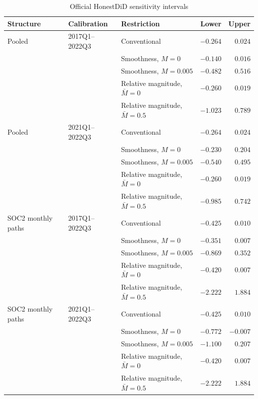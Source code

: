 \begin{table}[!htbp]
\centering
\caption{Official HonestDiD sensitivity intervals}\label{tab:app_honestdid}
\small
\begin{tabular}{lllrr}
\toprule
Structure & Calibration & Restriction & Lower & Upper \\
\midrule
Pooled & 2017Q1--2022Q3 & Conventional & $-0.264$ & $0.024$ \\
       &                 & Smoothness, $M=0$ & $-0.140$ & $0.016$ \\
       &                 & Smoothness, $M=0.005$ & $-0.482$ & $0.516$ \\
       &                 & Relative magnitude, $\bar M=0$ & $-0.260$ & $0.019$ \\
       &                 & Relative magnitude, $\bar M=0.5$ & $-1.023$ & $0.789$ \\
Pooled & 2021Q1--2022Q3 & Conventional & $-0.264$ & $0.024$ \\
       &                 & Smoothness, $M=0$ & $-0.230$ & $0.204$ \\
       &                 & Smoothness, $M=0.005$ & $-0.540$ & $0.495$ \\
       &                 & Relative magnitude, $\bar M=0$ & $-0.260$ & $0.019$ \\
       &                 & Relative magnitude, $\bar M=0.5$ & $-0.985$ & $0.742$ \\
\addlinespace
SOC2 monthly paths & 2017Q1--2022Q3 & Conventional & $-0.425$ & $0.010$ \\
       &                 & Smoothness, $M=0$ & $-0.351$ & $0.007$ \\
       &                 & Smoothness, $M=0.005$ & $-0.869$ & $0.352$ \\
       &                 & Relative magnitude, $\bar M=0$ & $-0.420$ & $0.007$ \\
       &                 & Relative magnitude, $\bar M=0.5$ & $-2.222$ & $1.884$ \\
SOC2 monthly paths & 2021Q1--2022Q3 & Conventional & $-0.425$ & $0.010$ \\
       &                 & Smoothness, $M=0$ & $-0.772$ & $-0.007$ \\
       &                 & Smoothness, $M=0.005$ & $-1.100$ & $0.207$ \\
       &                 & Relative magnitude, $\bar M=0$ & $-0.420$ & $0.007$ \\
       &                 & Relative magnitude, $\bar M=0.5$ & $-2.222$ & $1.884$ \\

\end{tabular}
\end{table}
